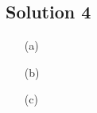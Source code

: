\subsection*{Solution 4}

\begin{itemize}
\item[(a)]
\todo
\item[(b)]
\todo
\item[(c)]
\todo
\end{itemize}

